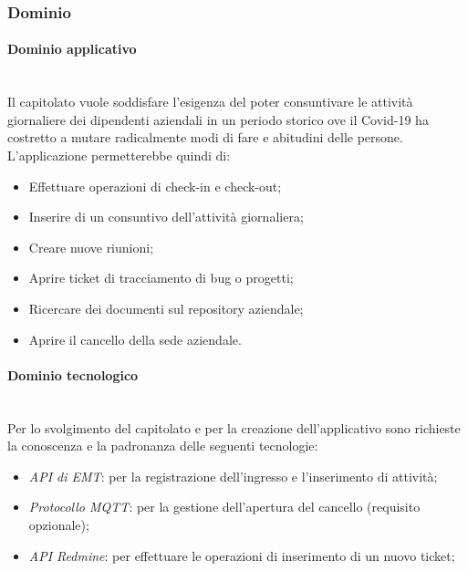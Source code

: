 \documentclass[11pt]{article}
\begin{document}
    \subsubsection{Dominio}
        \paragraph{Dominio applicativo}~\\

		\noindent
        Il capitolato vuole soddisfare l'esigenza del poter consuntivare le attività giornaliere dei dipendenti aziendali in un
        periodo storico ove il Covid-19 ha costretto a mutare radicalmente modi di fare e abitudini delle persone.
        L'applicazione permetterebbe quindi di:
		\begin{itemize}
			\item Effettuare operazioni di check-in e check-out;
			\item Inserire di un consuntivo dell'attività giornaliera;
			\item Creare nuove riunioni;
			\item Aprire ticket di tracciamento di bug o progetti;
			\item Ricercare dei documenti sul repository aziendale;
			\item Aprire il cancello della sede aziendale.			
		\end{itemize}		        
		
        \paragraph{Dominio tecnologico}~\\
        
        \noindent
        Per lo svolgimento del capitolato e per la creazione dell'applicativo sono richieste la conoscenza e la padronanza
        delle seguenti tecnologie:
        \begin{itemize}
            \item \textit{API di EMT}: per la registrazione dell'ingresso e l'inserimento di attività;
            \item \textit{Protocollo MQTT}: per la gestione dell'apertura del cancello (requisito opzionale);
            \item \textit{API Redmine}: per effettuare le operazioni di inserimento di un nuovo ticket;
        \end{itemize}
    
\end{document}
